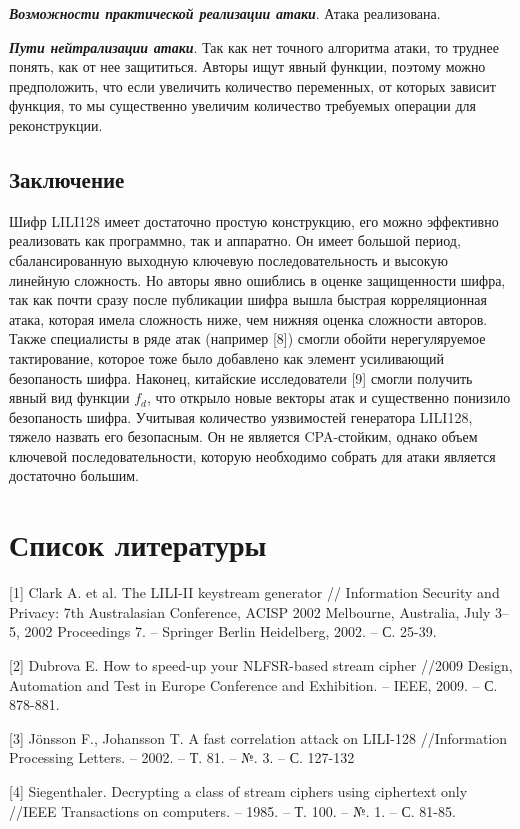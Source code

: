 \documentclass[colorthm]{./civarticle}
\begin{document}
    \textbf{\emph{Возможности практической реализации атаки}}. Атака реализована.
    
    \textbf{\emph{Пути нейтрализации атаки}}. Так как нет точного алгоритма атаки, то труднее понять, как от нее защититься. Авторы ищут явный функции, поэтому можно предположить, что если увеличить количество переменных, от которых зависит функция, то мы существенно увеличим количество требуемых операции для реконструкции.

\subsection{Заключение}

Шифр LILI128 имеет достаточно простую конструкцию, его можно эффективно реализовать как программно, так и аппаратно. Он имеет большой период, сбалансированную выходную ключевую последовательность и высокую линейную сложность. Но авторы явно ошиблись в оценке защищенности шифра, так как почти сразу после публикации шифра вышла быстрая корреляционная атака, которая имела сложность ниже, чем нижняя оценка сложности авторов. Также специалисты в ряде атак (например [8]) смогли обойти нерегуляруемое тактирование, которое тоже было добавлено как элемент усиливающий безопаность шифра. Наконец, китайские исследователи [9] смогли получить явный вид функции $f_d$, что открыло новые векторы атак и существенно понизило безопаность шифра. Учитывая количество уязвимостей генератора LILI128, тяжело назвать его безопасным. Он не является CPA-стойким, однако объем ключевой последовательности, которую необходимо собрать для атаки является достаточно большим.

\section{Список литературы}

[1] Clark A. et al. The LILI-II keystream generator // Information Security and Privacy: 7th Australasian Conference, ACISP 2002 Melbourne, Australia, July 3–5, 2002 Proceedings 7. – Springer Berlin Heidelberg, 2002. – С. 25-39.

[2] Dubrova E. How to speed-up your NLFSR-based stream cipher //2009 Design, Automation and Test in Europe Conference and Exhibition. – IEEE, 2009. – С. 878-881.

[3] Jönsson F., Johansson T. A fast correlation attack on LILI-128 //Information Processing Letters. – 2002. – Т. 81. – №. 3. – С. 127-132

[4] Siegenthaler. Decrypting a class of stream ciphers using ciphertext only //IEEE Transactions on computers. – 1985. – Т. 100. – №. 1. – С. 81-85.
\end{document}
